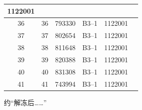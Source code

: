 \documentclass[UTF8,10pt,a4paper,fontset=fandol]{ctexart}
\newcommand{\fieldvalue}[1]{#1}
\newcommand{\handwritten}[1]{#1}
\begin{document}
\begin{center}
\begin{tabularx}{\textwidth}{|c|c|c|c|c|X|}
\fieldvalue{1122001} & \\
\hline
36 &
\fieldvalue{36} &
\fieldvalue{793330} &
\fieldvalue{B3--1} &
\fieldvalue{1122001} & \\
\hline
37 &
\fieldvalue{37} &
\fieldvalue{802654} &
\fieldvalue{B3--1} &
\fieldvalue{1122001} & \\
\hline
38 &
\fieldvalue{38} &
\fieldvalue{811648} &
\fieldvalue{B3--1} &
\fieldvalue{1122001} & \\
\hline
39 &
\fieldvalue{39} &
\fieldvalue{820388} &
\fieldvalue{B3--1} &
\fieldvalue{1122001} & \\
\hline
40 &
\fieldvalue{40} &
\fieldvalue{831308} &
\fieldvalue{B3--1} &
\fieldvalue{1122001} & \\
\hline
41 &
\fieldvalue{41} &
\fieldvalue{743994} &
\fieldvalue{B3--1} &
\fieldvalue{1122001} & \\
\hline
\end{tabularx}
\end{center}

\handwritten{约“解冻后……”}
\end{document}
